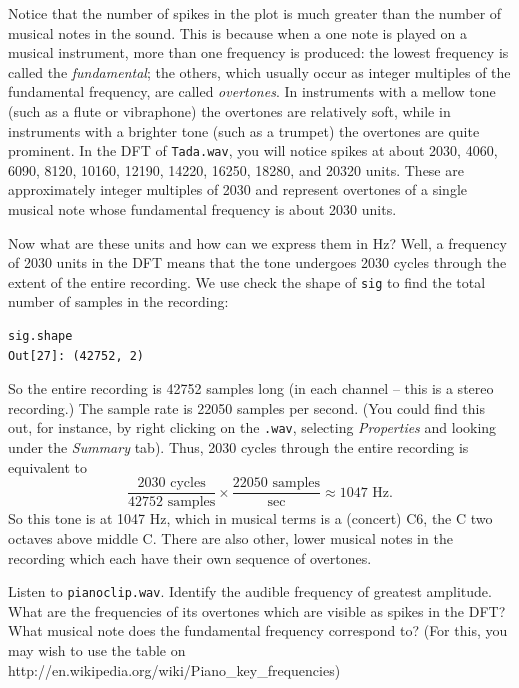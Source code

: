 Notice that the number of spikes in the plot is much greater than the number of musical notes in the sound. This is because when a one note is played on a musical instrument, more than one frequency is produced: the lowest frequency is called the \emph{fundamental}; the others, which usually occur as integer multiples of the fundamental frequency, are called \emph{overtones}. In instruments with a mellow tone (such as a flute or vibraphone) the overtones are relatively soft, while in instruments with a brighter tone (such as a trumpet) the overtones are quite prominent. In the DFT of \texttt{Tada.wav}, you will notice spikes at about 2030, 4060, 6090, 8120, 10160, 12190, 14220, 16250, 18280, and 20320 units. These are approximately integer multiples of 2030 and represent overtones of a single musical note whose fundamental frequency is about 2030 units.

Now what are these units and how can we express them in Hz? Well, a frequency of 2030 units in the DFT means that the tone undergoes 2030 cycles through the extent of the entire recording. We use check the shape of \texttt{sig} to find the total number of samples in the recording:
\begin{verbatim}
sig.shape
Out[27]: (42752, 2)
\end{verbatim}
So the entire recording is 42752 samples long (in each channel -- this is a stereo recording.) The sample rate is 22050 samples per second. (You could find this out, for instance, by right clicking on the \texttt{.wav}, selecting \emph{Properties} and looking under the \emph{Summary} tab).  Thus, 2030 cycles through the entire recording is equivalent to
$$\frac{2030\text{ cycles}}{42752\text{ samples}} \times \frac{22050\text{ samples}}{\text{sec}} \approx 1047 \text{ Hz}.$$
So this tone is at 1047 Hz, which in musical terms is a (concert) C6, the C two octaves above middle C. There are also other, lower musical notes in the recording which each have their own sequence of overtones.

\begin{problem}
Listen to \texttt{pianoclip.wav}. Identify the audible frequency of greatest amplitude. What are the frequencies of its overtones which are visible as spikes in the DFT? What musical note does the fundamental frequency correspond to? (For this, you may wish to use the table on http://en.wikipedia.org/wiki/Piano\_key\_frequencies)
\end{problem}

